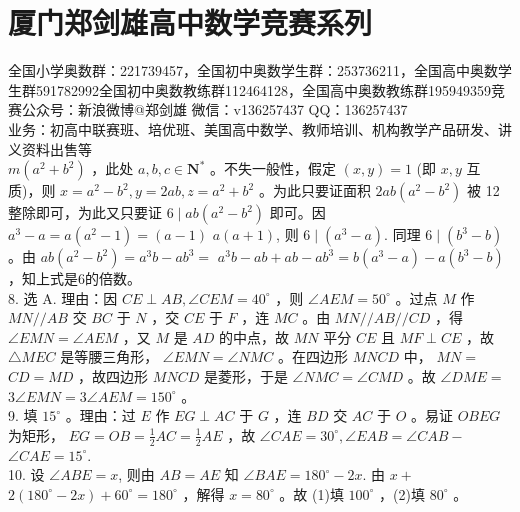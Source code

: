 \documentclass[10pt]{article}
\begin{document}
\section*{厦门郑剑雄高中数学竞赛系列}
全国小学奥数群：221739457，全国初中奥数学生群：253736211，全国高中奥数学生群591782992全国初中奥数教练群112464128，全国高中奥数教练群195949359竞赛公众号：新浪微博@郑剑雄 微信：v136257437 QQ：136257437\\
业务：初高中联赛班、培优班、美国高中数学、教师培训、机构教学产品研发、讲义资料出售等\\
$m\left(a^{2}+b^{2}\right)$ ，此处 $a, b, c \in \mathbf{N}^{*}$ 。不失一般性，假定 $(x, y)=1$ (即 $x, y$ 互质)，则 $x=a^{2}-b^{2}, y=2 a b, z=a^{2}+b^{2}$ 。为此只要证面积 $2 a b\left(a^{2}-b^{2}\right)$ 被 12 整除即可，为此又只要证 $6 \mid a b\left(a^{2}-b^{2}\right)$ 即可。因 $a^{3}-a=a\left(a^{2}-1\right)=(a-1)$ $a(a+1)$, 则 $6 \mid\left(a^{3}-a\right)$. 同理 $6 \mid\left(b^{3}-b\right)$ 。由 $a b\left(a^{2}-b^{2}\right)=a^{3} b-a b^{3}=$ $a^{3} b-a b+a b-a b^{3}=b\left(a^{3}-a\right)-a\left(b^{3}-b\right)$ ，知上式是6的倍数。\\
8. 选 A. 理由：因 $C E \perp A B, \angle C E M=40^{\circ}$ ，则 $\angle A E M=50^{\circ}$ 。过点 $M$ 作 $M N / / A B$ 交 $B C$ 于 $N$ ，交 $C E$ 于 $F$ ，连 $M C$ 。由 $M N / / A B / / C D$ ，得 $\angle E M N=\angle A E M$ ，又 $M$ 是 $A D$ 的中点，故 $M N$ 平分 $C E$ 且 $M F \perp C E$ ，故 $\triangle M E C$ 是等腰三角形， $\angle E M N=\angle N M C$ 。在四边形 $M N C D$ 中， $M N=$ $C D=M D$ ，故四边形 $M N C D$ 是菱形，于是 $\angle N M C=\angle C M D$ 。故 $\angle D M E=$ $3 \angle E M N=3 \angle A E M=150^{\circ}$ 。\\
9. 填 $15^{\circ}$ 。理由：过 $E$ 作 $E G \perp A C$ 于 $G$ ，连 $B D$ 交 $A C$ 于 $O$ 。易证 $O B E G$为矩形， $E G=O B=\frac{1}{2} A C=\frac{1}{2} A E$ ，故 $\angle C A E=30^{\circ}, \angle E A B=\angle C A B-$ $\angle C A E=15^{\circ}$.\\
10. 设 $\angle A B E=x$, 则由 $A B=A E$ 知 $\angle B A E=180^{\circ}-2 x$. 由 $x+$ $2\left(180^{\circ}-2 x\right)+60^{\circ}=180^{\circ}$ ，解得 $x=80^{\circ}$ 。故 (1)填 $100^{\circ}$ ，(2)填 $80^{\circ}$ 。
\end{document}
